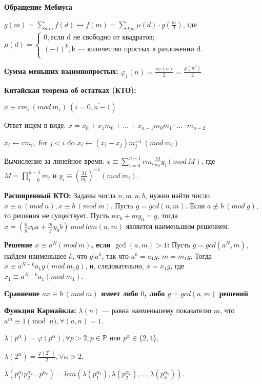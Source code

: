 \textbf{Обращение Мебиуса}

$g(m) = \sum\limits_{d | m} f(d) \leftrightarrow f(m) = \sum\limits_{d | m} \mu(d) \cdot g(\frac{m}{d}) $, где $\mu(d) = 
\begin{cases}
0, \text{если d не свободно от квадратов;}\\
(-1)^k, \text{k --- количество простых в разложении d.}\\
\end{cases}$

\textbf{Сумма меньших взаимнопростых:}
$\varphi_1(n) = \frac{n\varphi(n)}{2}=\frac{\varphi(n^2)}{2}$

\textbf{Китайская теорема об остатках (КТО):}

$x \equiv rm_i\ (mod\ m_i)\ (i=\overline{0,n - 1})$

Ответ ищем в виде: $x = x_0 + x_1 m_0 + \ldots + x_{n - 1}m_0m_1\cdot\ldots\cdot m_{n - 2}$

$x_i \leftarrow rm_i,$ for $j < i$ do $x_i \leftarrow (x_i - x_j) m_j^{-1}\ (mod\ m_i)$

Вычисление за линейное время: $x \equiv \sum \limits_{i=0}^{n-1} rm_i \frac{M}{m_i}y_i (mod\ M)$, где $M=\prod \limits_{i=0}^{n-1} m_i$
и $y_i \equiv \left ( \frac{M}{m_i} \right )^{-1} (mod\ m_i)$.

\textbf{Расширенный КТО:}
Заданы числа $n, m, a, b$, нужно найти число $x\equiv a\ (mod\ n), x\equiv b\ (mod\ m)$. Пусть $g=gcd(n, m)$. Если $a\not\equiv b\ (mod\ g)$,
то решения не существует. Пусть $nx_0+my_0=g$, тогда $x=\left(\frac ng x_0 a+\frac mg y_0 b\right)\ mod\ lcm(n, m)$ является наименьшим решением.

\textbf{Решение $x \equiv a^N (mod\ m)$, если $\gcd(a, m) > 1$:}
Пусть $g = gcd(a^N, m)$, найдем наименьшее $k$, что $g | a^k$, так что $a^k=a_1g$, $m=m_1g$.
Тогда $x \equiv a^{N-k}a_1g (mod\ m_1g)$, и, следовательно, $x = x_1g$, где $x_1 \equiv a^{N-k}a_1 (mod\ m_1)$.

\textbf{Сравнение $ax\equiv b\ (mod\ m)$ имеет либо $0$, либо $g = gcd(a, m)$ решений}

\textbf{Функция Кармайкла:}
$\lambda(n)$ --- равна наименьшему показателю $m$, что $a^m \equiv 1 \pmod n, \forall (a, n)=1$.

$\lambda(p^\alpha)=\varphi(p^\alpha), \forall p>2, p\in \mathbb{P}$ или  $p^\alpha\in \{2, 4\}$,

$\lambda(2^\alpha)=\frac{\varphi(2^\alpha)}2, \forall \alpha>2$,

$\lambda(p_1^{\alpha_1} p_2^{\alpha_2}\ldots p^{\alpha_k})=lcm(\lambda(p_1^{\alpha_1}), \lambda(p_2^{\alpha_2}), \ldots, \lambda(p_k^{\alpha_k}))$.

